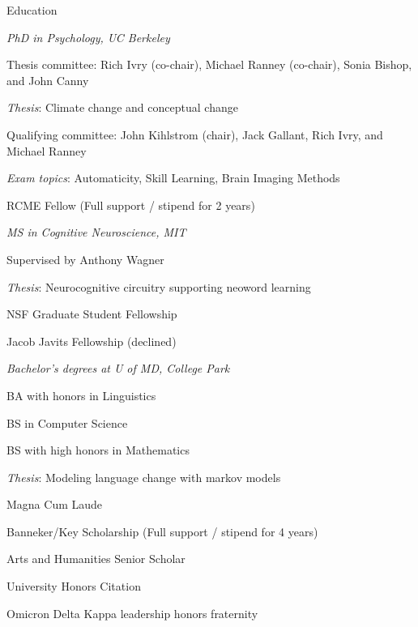 \begin{rubric}{Education}

\entry*[2007--2013] \emph{PhD in Psychology, UC Berkeley}
\par Thesis committee: Rich Ivry (co-chair), Michael Ranney (co-chair), Sonia
Bishop, and John Canny
\par \emph{Thesis}: Climate change and conceptual change
\par Qualifying committee: John Kihlstrom (chair), Jack Gallant, Rich Ivry, and
Michael Ranney
\par \emph{Exam topics}: Automaticity, Skill Learning, Brain Imaging Methods
\par RCME Fellow (Full support / stipend for 2 years)


\entry*[1999--2002] \emph{MS in Cognitive Neuroscience, MIT}
\par Supervised by Anthony Wagner
\par \emph{Thesis}: Neurocognitive circuitry supporting neoword learning
\par NSF Graduate Student Fellowship
\par Jacob Javits Fellowship (declined)




\entry*[1995--1999] \emph{Bachelor's degrees at U of MD, College Park}
\par BA with honors in Linguistics
\par BS in Computer Science
\par BS with high honors in Mathematics
\par \emph{Thesis}: Modeling language change with markov models
\par Magna Cum Laude
\par Banneker/Key Scholarship (Full support / stipend for 4 years)
\par Arts and Humanities Senior Scholar
\par University Honors Citation
\par Omicron Delta Kappa leadership honors fraternity

 

\end{rubric}
